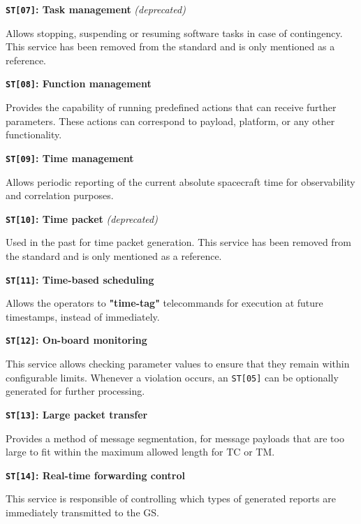 \documentclass[a4paper,nobib]{tufte-book}
\begin{document}
\begin{compactitem}
	\item \textbf{\texttt{ST[07]}: Task management} \emph{(deprecated)}
	
	Allows stopping, suspending or resuming software tasks in case of contingency. This service has been removed from the standard and is only mentioned as a reference.
	
	\item \textbf{\texttt{ST[08]}: Function management}
	
	Provides the capability of running predefined actions that can receive further parameters. These actions can correspond to payload, platform, or any other functionality.
	
	\item \textbf{\texttt{ST[09]}: Time management}
	
	Allows periodic reporting of the current absolute spacecraft time for observability and correlation purposes.
	
	\item \textbf{\texttt{ST[10]}: Time packet} \emph{(deprecated)}
	
	Used in the past for time packet generation. This service has been removed from the standard and is only mentioned as a reference.
	
	\item \textbf{\texttt{ST[11]}: Time-based scheduling}
	
	Allows the operators to \textbf{"time-tag"} telecommands for execution at future timestamps, instead of immediately.
	
	\item \textbf{\texttt{ST[12]}: On-board monitoring}
	
	This service allows checking parameter values to ensure that they remain within configurable limits. Whenever a violation occurs, an \texttt{ST[05]} can be optionally generated for further processing.
	
	\item \textbf{\texttt{ST[13]}: Large packet transfer}
	
	Provides a method of message segmentation, for message payloads that are too large to fit within the maximum allowed length for \ac{TC} or \ac{TM}.
	
	\item \textbf{\texttt{ST[14]}: Real-time forwarding control}
	
	This service is responsible of controlling which types of generated reports are immediately transmitted to the \acl{GS}.
	

\end{compactitem}
\end{document}
